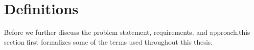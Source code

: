 
\section{Definitions}
\label{sec:introDefinition}

Before we further discuss the problem statement, requirements, and approach,this section first formalizes some of the terms used throughout this thesis.

